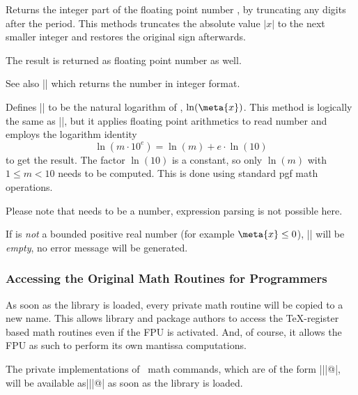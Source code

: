 \begin{command}{\pgfmathfloatint{}}
    Returns the integer part of the floating point number , by
    truncating any digits after the period. This methods truncates the absolute
    value $\rvert x \lvert$ to the next smaller integer and restores the
    original sign afterwards.

    The result is returned as floating point number as well.

    See also |\pgfmathfloattoint| which returns the number in integer format.
\end{command}

\begin{command}{}
    Defines |\pgfmathresult| to be the natural logarithm of ,
    $\ln(\meta{x})$. This method is logically the same as |\pgfmathln|, but it
    applies floating point arithmetics to read number  and employs the
    logarithm identity \[ \ln(m \cdot 10^e) = \ln(m) + e \cdot \ln(10) \] to
    get the result. The factor $\ln(10)$ is a constant, so only $\ln(m)$ with
    $1 \le m < 10$ needs to be computed. This is done using standard pgf math
    operations.

    Please note that  needs to be a number, expression parsing is not
    possible here.

    If  is \emph{not} a bounded positive real number (for example
    $\meta{x} \le 0$), |\pgfmathresult| will be \emph{empty}, no error message
    will be generated.
\begin{codeexample}[preamble={\usetikzlibrary{fpu}}]
\pgfmathresult
\end{codeexample}
\begin{codeexample}[preamble={\usetikzlibrary{fpu}}]
\pgfmathresult
\end{codeexample}
\end{command}


\subsubsection{Accessing the Original Math Routines for Programmers}

As soon as the library is loaded, every private math routine will be copied to
a new name. This allows library and package authors to access the \TeX-register
based math routines even if the FPU is activated. And, of course, it allows the
FPU as such to perform its own mantissa computations.

The private implementations of \pgfname\ math commands, which are of the form
|\pgfmath||@|, will be available as|\pgfmath@basic@||@|
as soon as the library is loaded.

\endgroup
